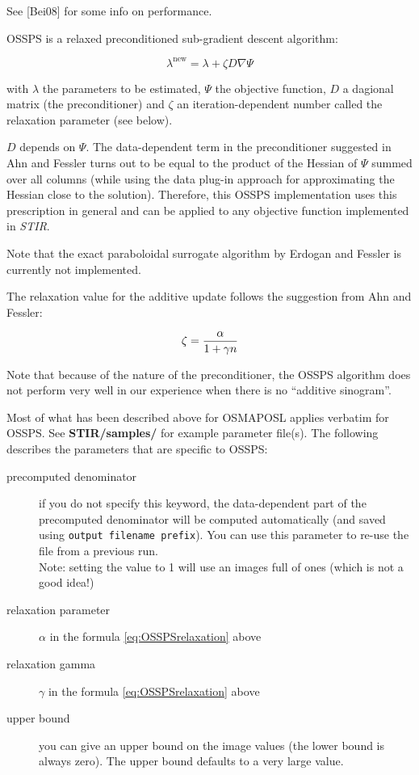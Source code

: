 \documentclass{article}
\begin{document}
See [Bei08] for some info on performance.

{ 
}
\label{sec:OSSPS}

  { 
  }

  OSSPS is a relaxed preconditioned sub-gradient descent algorithm:

  \[ \lambda^\mathrm{new} = \lambda + \zeta D \nabla \Psi \]

  with $\lambda$ the parameters to be estimated,
  $\Psi$ the objective function,
  $D$ a dagional matrix (the preconditioner)
  and $\zeta$ an iteration-dependent number called the relaxation parameter (see below).

  $D$ depends on $\Psi$. The data-dependent term in the preconditioner 
  suggested in Ahn and Fessler turns out to be equal to the product of the Hessian of 
  $\Psi$ summed over all columns (while using the data plug-in approach for 
  approximating the Hessian close to the solution). Therefore, this OSSPS 
  implementation uses this prescription in general and can be applied to any objective
   function implemented in \textit{STIR}.  

  Note that the exact paraboloidal surrogate algorithm by Erdogan and Fessler is currently
  not implemented.

  The relaxation value for the additive update follows the suggestion from Ahn and Fessler:

 \begin{equation}
  \zeta= { \alpha \over 1+ \gamma n } \label{eq:OSSPSrelaxation}
 \end{equation} 

  Note that because of the nature of the preconditioner, the OSSPS algorithm does not
  perform very well in our experience when there is no ``additive sinogram''.

{ 
}

 Most of what has been described above for OSMAPOSL applies verbatim for OSSPS. 
 See \textbf{STIR/samples/} for example parameter file(s). The
 following describes the parameters that are specific to OSSPS:

 \begin{description}
 \item[precomputed denominator]
   if you do not specify this keyword, the data-dependent part of the
   precomputed denominator will be computed automatically (and saved using
   \texttt{output filename prefix}). You can use this parameter to
   re-use the file from a previous run. \\
   Note: setting the value to 1 will use an images full of ones (which is not a good idea!)

 \item[relaxation parameter]
   $\alpha$ in the formula \ref{eq:OSSPSrelaxation} above
 \item[relaxation gamma]
   $\gamma$ in the formula \ref{eq:OSSPSrelaxation} above

 \item[upper bound]
  you can give an upper bound on the image values (the lower bound is always zero). The upper
  bound defaults to a very large value.
\end{description}
\end{document}
